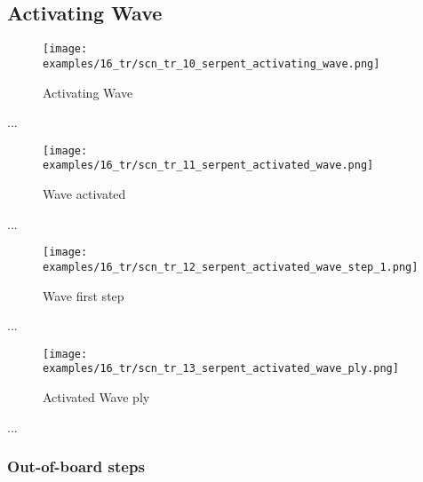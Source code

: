 \subsection*{Activating Wave}

\noindent
\begin{wrapfigure}[1]{l}{0.4\textwidth}
\centering
\texttt{[image: examples/16\_tr/scn\_tr\_10\_serpent\_activating\_wave.png]}
\caption{Activating Wave}
\label{fig:scn_tr_10_serpent_activating_wave}
\end{wrapfigure}
...

\vspace*{7.0\baselineskip}
\noindent
\begin{wrapfigure}[1]{l}{0.4\textwidth}
\centering
\texttt{[image: examples/16\_tr/scn\_tr\_11\_serpent\_activated\_wave.png]}
\caption{Wave activated}
\label{fig:scn_tr_11_serpent_activated_wave}
\end{wrapfigure}
...

\vspace*{7.0\baselineskip}
\noindent
\begin{wrapfigure}[1]{l}{0.4\textwidth}
\centering
\texttt{[image: examples/16\_tr/scn\_tr\_12\_serpent\_activated\_wave\_step\_1.png]}
\caption{Wave first step}
\label{fig:scn_tr_12_serpent_activated_wave_step_1}
\end{wrapfigure}
...

\clearpage %

\noindent
\begin{figure}[!h]
\texttt{[image: examples/16\_tr/scn\_tr\_13\_serpent\_activated\_wave\_ply.png]}
\caption{Activated Wave ply}
\label{fig:scn_tr_13_serpent_activated_wave_ply}
\end{figure}

...

\clearpage %

\subsubsection*{Out-of-board steps}

